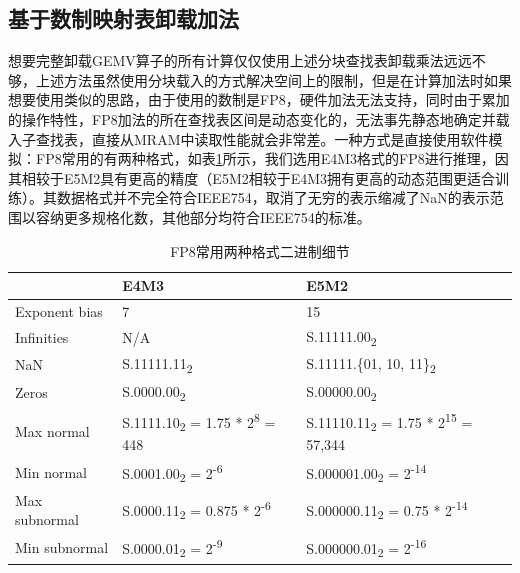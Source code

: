 \subsection{基于数制映射表卸载加法}
想要完整卸载GEMV算子的所有计算仅仅使用上述分块查找表卸载乘法远远不够，上述方法虽然使用分块载入的方式解决空间上的限制，但是在计算加法时如果想要使用类似的思路，由于使用的数制是FP8，硬件加法无法支持，同时由于累加的操作特性，FP8加法的所在查找表区间是动态变化的，无法事先静态地确定并载入子查找表，直接从MRAM中读取性能就会非常差。一种方式是直接使用软件模拟：FP8常用的有两种格式\cite{FP8}，如表\ref{FP8Format}所示，我们选用E4M3格式的FP8进行推理，因其相较于E5M2具有更高的精度（E5M2相较于E4M3拥有更高的动态范围更适合训练）。其数据格式并不完全符合IEEE754，取消了无穷的表示缩减了NaN的表示范围以容纳更多规格化数，其他部分均符合IEEE754的标准。
    
\begin{table}[!htbp]
    \caption{FP8常用两种格式二进制细节}
    \label{FP8Format}
    \begin{tabular}{lll}
        \toprule
        & E4M3 & E5M2 \\ 
        \midrule
        Exponent bias & 7 & 15 \\
        Infinities & N/A & S.11111.00\textsubscript{2} \\
        NaN & S.11111.11\textsubscript{2} & S.11111.\{01, 10, 11\}\textsubscript{2} \\
        Zeros & S.0000.00\textsubscript{2} & S.00000.00\textsubscript{2} \\
        Max normal & S.1111.10\textsubscript{2} = 1.75 * 2\textsuperscript{8} = 448 & S.11110.11\textsubscript{2} = 1.75 * 2\textsuperscript{15} = 57,344 \\
        Min normal & S.0001.00\textsubscript{2} = 2\textsuperscript{-6} & S.000001.00\textsubscript{2} = 2\textsuperscript{-14} \\
        Max subnormal & S.0000.11\textsubscript{2} = 0.875 * 2\textsuperscript{-6} & S.000000.11\textsubscript{2} = 0.75 * 2\textsuperscript{-14} \\
        Min subnormal & S.0000.01\textsubscript{2} = 2\textsuperscript{-9} & S.000000.01\textsubscript{2} = 2\textsuperscript{-16} \\ 
        \bottomrule
    \end{tabular}
\end{table}

